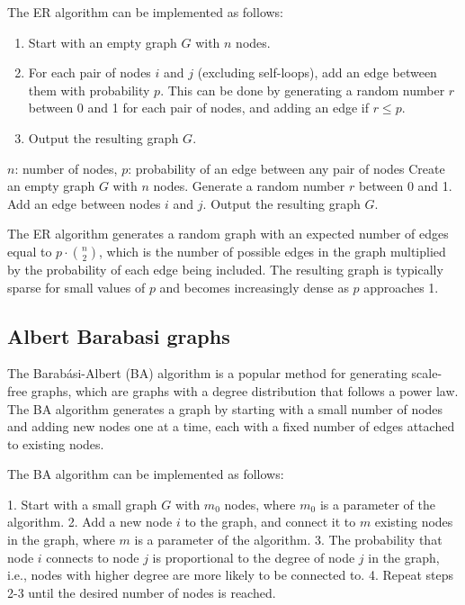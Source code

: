 The ER algorithm can be implemented as follows:
\begin{enumerate}
\item Start with an empty graph $G$ with $n$ nodes.
\item For each pair of nodes $i$ and $j$ (excluding self-loops), add an edge between them with probability $p$. This can be done by generating a random number $r$ between 0 and 1 for each pair of nodes, and adding an edge if $r \leq p$.
\item Output the resulting graph $G$.
\end{enumerate}

\begin{algorithmic}[1]
\Require $n$: number of nodes, $p$: probability of an edge between any pair of nodes
\State Create an empty graph $G$ with $n$ nodes.
        \State Generate a random number $r$ between 0 and 1.
            \State Add an edge between nodes $i$ and $j$.
        \EndIf
    \EndFor
\EndFor
\State Output the resulting graph $G$.
\end{algorithmic}

The ER algorithm generates a random graph with an expected number of edges equal to $p \cdot \binom{n}{2}$, which is the number of possible edges in the graph multiplied by the probability of each edge being included. The resulting graph is typically sparse for small values of $p$ and becomes increasingly dense as $p$ approaches 1.


\subsection{Albert Barabasi graphs}

The Barabási-Albert (BA) algorithm is a popular method for generating scale-free graphs, which are graphs with a degree distribution that follows a power law. The BA algorithm generates a graph by starting with a small number of nodes and adding new nodes one at a time, each with a fixed number of edges attached to existing nodes.

The BA algorithm can be implemented as follows:

1. Start with a small graph $G$ with $m_0$ nodes, where $m_0$ is a parameter of the algorithm.
2. Add a new node $i$ to the graph, and connect it to $m$ existing nodes in the graph, where $m$ is a parameter of the algorithm.
3. The probability that node $i$ connects to node $j$ is proportional to the degree of node $j$ in the graph, i.e., nodes with higher degree are more likely to be connected to.
4. Repeat steps 2-3 until the desired number of nodes is reached.

